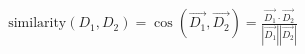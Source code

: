 \documentclass[preview]{standalone}
\begin{document}
\begin{align*}
\text{similarity}(D_1, D_2) = \cos(\vec{D_1}, \vec{D_2}) = \frac{\vec{D_1} \cdot \vec{D_2}}{|\vec{D_1}||\vec{D_2}|}
\end{align*}
\end{document}
